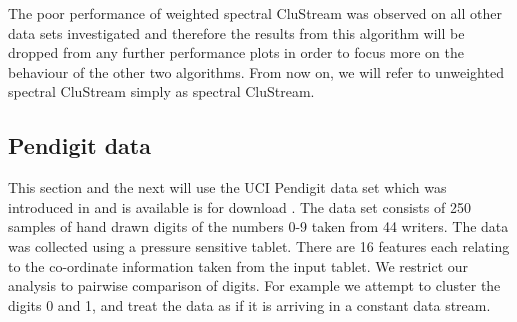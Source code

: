 The poor performance of weighted spectral CluStream was observed on all other data sets investigated and therefore the results from this algorithm  will be dropped from any further performance plots in order to focus more on the behaviour of the other two algorithms.  From now on, we will refer to unweighted spectral CluStream simply as spectral CluStream.
\newpage
\subsection{Pendigit data}
This section and the next will use the UCI Pendigit data set which was introduced in \cite{Alimoglu1996} and is available is for download \citep{Lichman2013}. The data set consists of 250 samples of hand drawn digits of the numbers 0-9 taken from 44 writers. The data was collected using a pressure sensitive tablet. There are 16 features each relating to the co-ordinate information taken from the input tablet. We restrict our analysis to pairwise comparison of digits. For example we attempt to cluster the digits 0 and 1, and treat the data as if it is arriving in a constant data stream.

